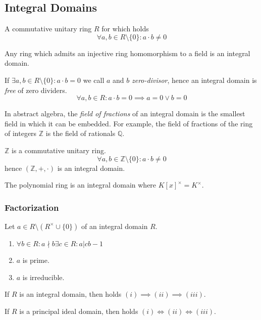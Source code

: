 \subsection{Integral Domains}
\begin{definition}\label{def:integral_domain}
   A commutative unitary ring \(R\) for which holds
   \[\forall a, b \in R \setminus \{0\}: a \cdot b \neq 0\]
\end{definition}
\begin{remark}
   Any ring which admits an injective ring homomorphism to a field is an integral domain.
\end{remark}
\begin{remark}
   If \(\exists a, b \in R \setminus \{0\}: a \cdot b = 0\) we call \(a\) and \(b\) \emph{zero-divisor}, hence an integral domain is \emph{free} of zero dividers.
   \[\forall a, b \in R: a \cdot b = 0 \implies a = 0 \lor b = 0\]
\end{remark}
\begin{remark}
   In abstract algebra, the \emph{field of fractions} of an integral domain is the smallest field in which it can be embedded.
   For example, the field of fractions of the ring of integers \(\mathbb{Z}\) is the field of rationals \(\mathbb{Q}\).
\end{remark}
\begin{example}
   \(\mathbb{Z}\) is a commutative unitary ring.
   \[\forall a, b \in \mathbb{Z} \setminus \{0\}: a \cdot b \neq 0\]
   hence \((\mathbb{Z}, +, \cdot)\) is an integral domain.
\end{example}
\begin{example}[Polynomials]
   The polynomial ring is an integral domain where \(K[x]^{\times} = K^{\times}\).
\end{example}

\subsubsection{Factorization}
\begin{proposition}
   Let \(a \in R \setminus (R^\times \cup \{0\})\) of an integral domain \(R\).
   \begin{enumerate}[label=\roman*, align=Center]
      \item \(\forall b \in R: a\nmid b \exists c \in R: a | cb -1\)
      \item \(a\) is prime.
      \item \(a\) is irreducible.
   \end{enumerate}

   If \(R\) is an integral domain, then holds \((i) \implies (ii) \implies (iii)\).

   If \(R\) is a principal ideal domain, then holds \((i) \iff (ii) \iff (iii)\).
\end{proposition}

